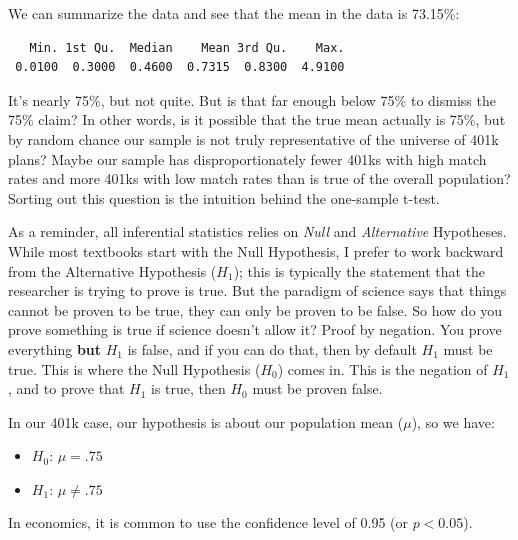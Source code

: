 \documentclass[
  letterpaper,
]{book}
\newenvironment{Shaded}{\begin{snugshade}}{\end{snugshade}}
\newcommand{\FunctionTok}[1]{\textcolor[rgb]{0.28,0.35,0.67}{#1}}
\newcommand{\NormalTok}[1]{\textcolor[rgb]{0.00,0.23,0.31}{#1}}
\newcommand{\SpecialCharTok}[1]{\textcolor[rgb]{0.37,0.37,0.37}{#1}}
\providecommand{\tightlist}{%
  \setlength{\itemsep}{0pt}\setlength{\parskip}{0pt}}\usepackage{longtable,booktabs,array}
\begin{document}
We can summarize the data and see that the mean in the data is 73.15\%:

\begin{Shaded}
\end{Shaded}

\begin{verbatim}
   Min. 1st Qu.  Median    Mean 3rd Qu.    Max. 
 0.0100  0.3000  0.4600  0.7315  0.8300  4.9100 
\end{verbatim}

It's nearly 75\%, but not quite. But is that far enough below 75\% to
dismiss the 75\% claim? In other words, is it possible that the true
mean actually is 75\%, but by random chance our sample is not truly
representative of the universe of 401k plans? Maybe our sample has
disproportionately fewer 401ks with high match rates and more 401ks with
low match rates than is true of the overall population? Sorting out this
question is the intuition behind the one-sample t-test.

As a reminder, all inferential statistics relies on \emph{Null} and
\emph{Alternative} Hypotheses. While most textbooks start with the Null
Hypothesis, I prefer to work backward from the Alternative Hypothesis
(\(H_1\)); this is typically the statement that the researcher is trying
to prove is true. But the paradigm of science says that things cannot be
proven to be true, they can only be proven to be false. So how do you
prove something is true if science doesn't allow it? Proof by negation.
You prove everything \textbf{but} \(H_1\) is false, and if you can do
that, then by default \(H_1\) must be true. This is where the Null
Hypothesis (\(H_0\)) comes in. This is the negation of \(H_1\), and to
prove that \(H_1\) is true, then \(H_0\) must be proven false.

In our 401k case, our hypothesis is about our population mean (\(\mu\)),
so we have:

\begin{itemize}
\tightlist
\item
  \(H_0\): \(\mu = .75\)
\item
  \(H_1\): \(\mu \ne .75\)
\end{itemize}

In economics, it is common to use the confidence level of 0.95 (or
\(p<0.05\)).
\end{document}
